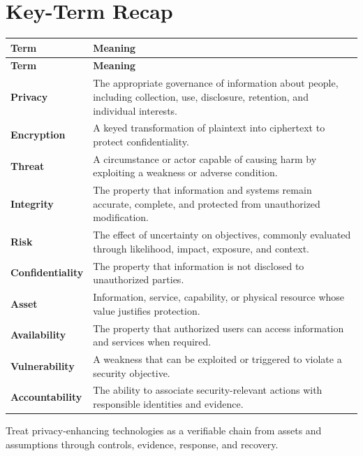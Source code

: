 \documentclass[11pt]{article}
\begin{document}
\section*{Key-Term Recap}
\begin{longtable}{>{\RaggedRight\arraybackslash}p{}>{\RaggedRight\arraybackslash}p{}}
\toprule\rowcolor{Navy}\color{white}\textbf{Term} & \color{white}\textbf{Meaning}\\\midrule
\endfirsthead
\toprule\rowcolor{Navy}\color{white}\textbf{Term} & \color{white}\textbf{Meaning}\\\midrule
\endhead
\textbf{Privacy} & The appropriate governance of information about people, including collection, use, disclosure, retention, and individual interests. \\\midrule
\textbf{Encryption} & A keyed transformation of plaintext into ciphertext to protect confidentiality. \\\midrule
\textbf{Threat} & A circumstance or actor capable of causing harm by exploiting a weakness or adverse condition. \\\midrule
\textbf{Integrity} & The property that information and systems remain accurate, complete, and protected from unauthorized modification. \\\midrule
\textbf{Risk} & The effect of uncertainty on objectives, commonly evaluated through likelihood, impact, exposure, and context. \\\midrule
\textbf{Confidentiality} & The property that information is not disclosed to unauthorized parties. \\\midrule
\textbf{Asset} & Information, service, capability, or physical resource whose value justifies protection. \\\midrule
\textbf{Availability} & The property that authorized users can access information and services when required. \\\midrule
\textbf{Vulnerability} & A weakness that can be exploited or triggered to violate a security objective. \\\midrule
\textbf{Accountability} & The ability to associate security-relevant actions with responsible identities and evidence. \\\midrule
\bottomrule
\end{longtable}
\begin{takeawaybox}
Treat privacy-enhancing technologies as a verifiable chain from assets and assumptions through controls, evidence, response, and recovery.
\end{takeawaybox}
\end{document}
